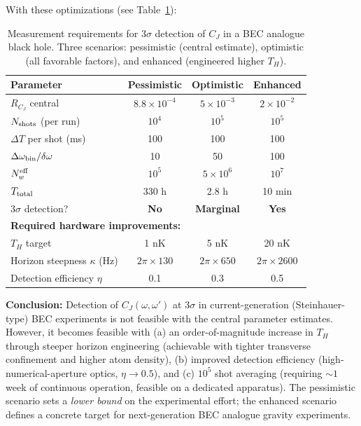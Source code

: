 \documentclass[prd,aps,showpacs,superscriptaddress,twocolumn]{revtex4-2}
\begin{document}
With these optimizations (see Table~\ref{tab:BEC_3sigma}):

\begin{table}[h]
\centering
\caption{Measurement requirements for $3\sigma$ detection of $C_J$ in a BEC analogue black hole. Three scenarios: pessimistic (central estimate), optimistic (all favorable factors), and enhanced (engineered higher $T_H$).}
\label{tab:BEC_3sigma}
\begin{tabular}{lccc}
\toprule
\textbf{Parameter} & \textbf{Pessimistic} & \textbf{Optimistic} & \textbf{Enhanced} \\
\midrule
$R_{C_J}$ central & $8.8 \times 10^{-4}$ & $5 \times 10^{-3}$ & $2 \times 10^{-2}$ \\
$N_{\rm shots}$ (per run) & $10^4$ & $10^5$ & $10^5$ \\
$\Delta T$ per shot (ms) & 100 & 100 & 100 \\
$\Delta\omega_{\rm bin} / \delta\omega$ & 10 & 50 & 100 \\
$N_w^{\rm eff}$ & $10^5$ & $5 \times 10^6$ & $10^7$ \\
$T_{\rm total}$ & 330 h & 2.8 h & 10 min \\
$3\sigma$ detection? & \textbf{No} & \textbf{Marginal} & \textbf{Yes} \\
\midrule
\multicolumn{4}{l}{\textbf{Required hardware improvements:}} \\
$T_H$ target & 1 nK & 5 nK & 20 nK \\
Horizon steepness $\kappa$ (Hz) & $2\pi \times 130$ & $2\pi \times 650$ & $2\pi \times 2600$ \\
Detection efficiency $\eta$ & 0.1 & 0.3 & 0.5 \\
\bottomrule
\end{tabular}
\end{table}

\textbf{Conclusion:} Detection of $C_J(\omega,\omega')$ at $3\sigma$ in current-generation (Steinhauer-type) BEC experiments is not feasible with the central parameter estimates. However, it becomes feasible with (a) an order-of-magnitude increase in $T_H$ through steeper horizon engineering (achievable with tighter transverse confinement and higher atom density), (b) improved detection efficiency (high-numerical-aperture optics, $\eta \to 0.5$), and (c) $10^5$ shot averaging (requiring $\sim 1$ week of continuous operation, feasible on a dedicated apparatus). The pessimistic scenario sets a \emph{lower bound} on the experimental effort; the enhanced scenario defines a concrete target for next-generation BEC analogue gravity experiments.
\end{document}
